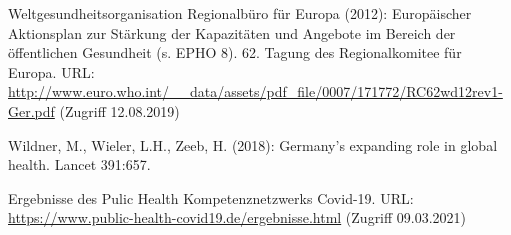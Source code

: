 \documentclass{article}
\begin{document}
Weltgesundheitsorganisation Regionalbüro für Europa (2012): Europäischer Aktionsplan zur Stärkung der Kapazitäten und Angebote im Bereich der öffentlichen Gesundheit (s. EPHO 8). 62. Tagung des Regionalkomitee für Europa. URL: \href{http://www.euro.who.int/__data/assets/pdf_file/0007/171772/RC62wd12rev1-Ger.pdf}{http://www.euro.who.int/\_\_data/assets/pdf\_file/0007/171772/RC62wd12rev1-Ger.pdf} (Zugriff 12.08.2019)


Wildner, M., Wieler, L.H., Zeeb, H. (2018): Germany’s expanding role in global health. Lancet 391:657.


Ergebnisse des Pulic Health Kompetenznetzwerks Covid-19. URL: \href{https://www.public-health-covid19.de/ergebnisse.html}{https://www.public-health-covid19.de/ergebnisse.html} (Zugriff 09.03.2021)
\end{document}
